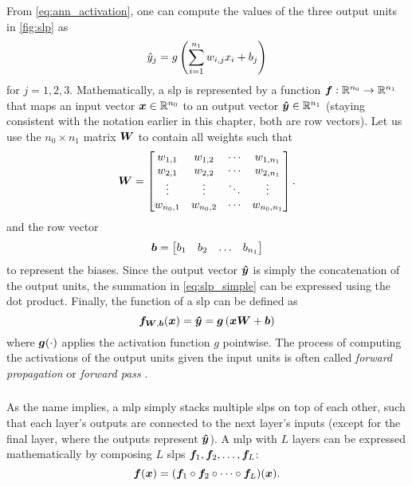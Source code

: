 \documentclass[../report.tex]{subfiles}
\begin{document}
From \cref{eq:ann_activation}, one can compute the values of the three output units in \cref{fig:slp} as
\begin{equation}
    \label{eq:slp_simple}
    \hat{y}_j = g\left(\sum_{i=1}^{n_1}{w_{i,j} x_i} + b_j\right)
\end{equation}
for $j=1,2,3$.
Mathematically, a \gls{slp} is represented by a function ${\bm{f}}:\mathbb{R}^{n_0}\to \mathbb{R}^{n_1}$ that maps an input vector ${\bm{x}} \in \mathbb{R}^{n_0}$ to an output vector ${\bm{\hat{y}}} \in \mathbb{R}^{n_1}$ (staying consistent with the notation earlier in this chapter, both are row vectors).
Let us use the $n_0 \times n_1$ matrix ${\bm{W}}$ to contain all weights such that
\begin{equation}
    \label{eq:slp_weights}
    {\bm{W}} = \begin{bmatrix}
        w_{1,1} & w_{1,2} & \cdots & w_{1,n_1} \\ 
        w_{2,1} & w_{2,2} & \cdots & w_{2,n_1} \\ 
        \vdots & \vdots & \ddots & \vdots \\ 
        w_{n_0,1} & w_{n_0,2} & \cdots & w_{n_0,n_1} \\ 
    \end{bmatrix}.
\end{equation}
and the row vector
\begin{equation}
    \label{eq:slp_biases}
    {\bm{b}} = \begin{bmatrix}
        b_1 & b_2 & \dots & b_{n_1}
    \end{bmatrix}
\end{equation}
to represent the biases.
Since the output vector ${\bm{\hat{y}}}$ is simply the concatenation of the output units, the summation in \cref{eq:slp_simple} can be expressed using the dot product. Finally, the function of a \gls{slp} can be defined as
\begin{equation}
    \label{eq:slp}
    {\bm{f}}_{{\bm{W}},{\bm{b}}}({\bm{x}}) = {\bm{\hat{y}}} = {\bm{g}}\left(
        {\bm{x}} {\bm{W}} + {\bm{b}}
    \right)
\end{equation}
where ${\bm{g}}(\cdot)$ applies the activation function $g$ pointwise.
The process of computing the activations of the output units given the input units is often called \emph{forward propagation} or \emph{forward pass} \cite{burkov2019}.

\subsubsection{}
As the name implies, a \gls{mlp} simply stacks multiple \glspl{slp} on top of each other, such that each layer's outputs are connected to the next layer's inputs (except for the final layer, where the outputs represent ${\bm{\hat{y}}}$).
A \gls{mlp} with $L$ layers can be expressed mathematically by composing $L$ \glspl{slp} ${\bm{f}}_1,{\bm{f}}_2,\dots,{\bm{f}}_L$:
\begin{equation}
    \label{eq:mlp}
    {\bm{f}}({\bm{x}}) = ({\bm{f}}_1 \circ {\bm{f}}_2 \circ \dots \circ {\bm{f}}_L)({\bm{x}}).
\end{equation}
\end{document}
